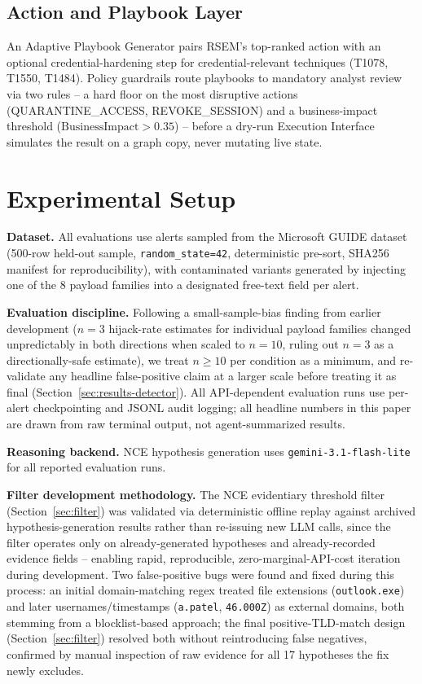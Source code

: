 \documentclass[conference]{IEEEtran}
\begin{document}
\subsection{Action and Playbook Layer}

An Adaptive Playbook Generator pairs RSEM's top-ranked action with an optional credential-hardening step for credential-relevant techniques (T1078, T1550, T1484). Policy guardrails route playbooks to mandatory analyst review via two rules -- a hard floor on the most disruptive actions (QUARANTINE\_ACCESS, REVOKE\_SESSION) and a business-impact threshold ($\text{BusinessImpact} > 0.35$) -- before a dry-run Execution Interface simulates the result on a graph copy, never mutating live state.

\section{Experimental Setup}
\label{sec:methodology}

\textbf{Dataset.} All evaluations use alerts sampled from the Microsoft GUIDE dataset (500-row held-out sample, \texttt{random\_state=42}, deterministic pre-sort, SHA256 manifest for reproducibility), with contaminated variants generated by injecting one of the 8 payload families into a designated free-text field per alert.

\textbf{Evaluation discipline.} Following a small-sample-bias finding from earlier development ($n=3$ hijack-rate estimates for individual payload families changed unpredictably in both directions when scaled to $n=10$, ruling out $n=3$ as a directionally-safe estimate), we treat $n \geq 10$ per condition as a minimum, and re-validate any headline false-positive claim at a larger scale before treating it as final (Section~\ref{sec:results-detector}). All API-dependent evaluation runs use per-alert checkpointing and JSONL audit logging; all headline numbers in this paper are drawn from raw terminal output, not agent-summarized results.

\textbf{Reasoning backend.} NCE hypothesis generation uses \texttt{gemini-3.1-flash-lite} for all reported evaluation runs.

\textbf{Filter development methodology.} The NCE evidentiary threshold filter (Section~\ref{sec:filter}) was validated via deterministic offline replay against archived hypothesis-generation results rather than re-issuing new LLM calls, since the filter operates only on already-generated hypotheses and already-recorded evidence fields -- enabling rapid, reproducible, zero-marginal-API-cost iteration during development. Two false-positive bugs were found and fixed during this process: an initial domain-matching regex treated file extensions (\texttt{outlook.exe}) and later usernames/timestamps (\texttt{a.patel}, \texttt{46.000Z}) as external domains, both stemming from a blocklist-based approach; the final positive-TLD-match design (Section~\ref{sec:filter}) resolved both without reintroducing false negatives, confirmed by manual inspection of raw evidence for all 17 hypotheses the fix newly excludes.
\end{document}
